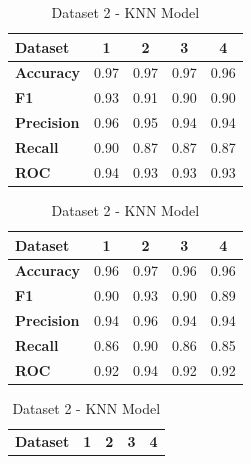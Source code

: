 \begin{table}[H]
    \centering
    \caption{KNN model cross-performance results}\label{tab:knn_model_cross-performance_results}
        \begin{subtable}[H]{0.45\textwidth}
            \centering
            \begin{tabular}{|l|c|c|c|c|}
            \hline
            \textbf{Dataset} & \textbf{1} & \textbf{2} & \textbf{3} & \textbf{4} \\
            \hline
            \textbf{Accuracy} & 0.97 & 0.97 & 0.97 & 0.96 \\
            \textbf{F1} & 0.93 & 0.91 & 0.90 & 0.90 \\
            \textbf{Precision} & 0.96 & 0.95 & 0.94 & 0.94 \\
            \textbf{Recall} & 0.90 & 0.87 & 0.87 & 0.87 \\
            \textbf{ROC} & 0.94 & 0.93 & 0.93 & 0.93 \\
            \hline
            \end{tabular}
            \caption{Dataset 1 - KNN Model}\label{subtab:dataset_1_knn_model}
        \end{subtable}
    \quad
    \begin{subtable}[H]{0.45\textwidth}
        \centering
        \begin{tabular}{|l|c|c|c|c|}
            \hline
            \textbf{Dataset} & \textbf{1} & \textbf{2} & \textbf{3} & \textbf{4} \\
            \hline
            \textbf{Accuracy} & 0.96 & 0.97 & 0.96 & 0.96 \\
            \textbf{F1} & 0.90 & 0.93 & 0.90 & 0.89 \\
            \textbf{Precision} & 0.94 & 0.96 & 0.94 & 0.94 \\
            \textbf{Recall} & 0.86 & 0.90 & 0.86 & 0.85 \\
            \textbf{ROC} & 0.92 & 0.94 & 0.92 & 0.92 \\
            \hline
        \end{tabular}
        \caption{Dataset 2 - KNN Model}\label{subtab:dataset_2_knn_model}
    \end{subtable}
    \quad
    \begin{subtable}[H]{0.45\textwidth}
        \centering
        \begin{tabular}{|l|c|c|c|c|}
            \hline
            \textbf{Dataset} & \textbf{1} & \textbf{2} & \textbf{3} & \textbf{4} \\

\end{tabular}
\end{subtable}
\end{table}
